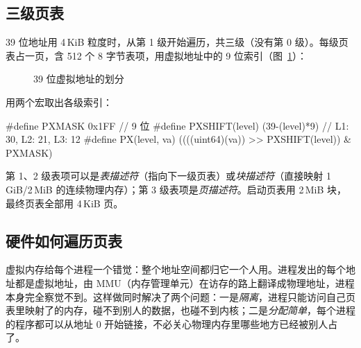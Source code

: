 \subsection{三级页表}

39 位地址用 4\,KiB 粒度时，从第 1 级开始遍历，共三级（没有第 0 级）。每级页表占一页，含 512 个 8 字节表项，用虚拟地址中的 9 位索引（图~\ref{fig:va}）：

\begin{figure}[htbp]
  \centering
  \caption{39 位虚拟地址的划分}
  \label{fig:va}
\end{figure}

 用两个宏取出各级索引：

\begin{ccode}
#define PXMASK          0x1FF                    // 9 位
#define PXSHIFT(level)  (39-(level)*9)           // L1: 30, L2: 21, L3: 12
#define PX(level, va)   ((((uint64)(va)) >> PXSHIFT(level)) & PXMASK)
\end{ccode}

第 1、2 级表项可以是\emph{表描述符}（指向下一级页表）或\emph{块描述符}（直接映射 1\,GiB/2\,MiB 的连续物理内存）；第 3 级表项是\emph{页描述符}。启动页表用 2\,MiB 块，最终页表全部用 4\,KiB 页。

\subsection{硬件如何遍历页表}
\label{sec:hw-walk}

虚拟内存给每个进程一个错觉：整个地址空间都归它一个人用。进程发出的每个地址都是虚拟地址，由 MMU（内存管理单元）在访存的路上翻译成物理地址，进程本身完全察觉不到。这样做同时解决了两个问题：一是\emph{隔离}，进程只能访问自己页表里映射了的内存，碰不到别人的数据，也碰不到内核；二是\emph{分配简单}，每个进程的程序都可以从地址 0 开始链接，不必关心物理内存里哪些地方已经被别人占了。

